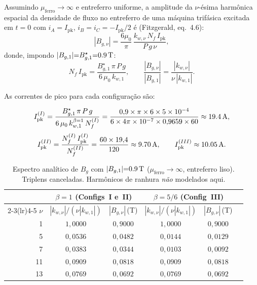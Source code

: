 \documentclass[12pt,a4paper]{article}
\begin{document}
Assumindo $\mu_\text{ferro}\to\infty$ e entreferro uniforme, a amplitude da
$\nu$-ésima harmônica espacial da densidade de fluxo no entreferro de uma
máquina trifásica excitada em $t{=}0$ com $i_A{=}I_\text{pk}$,
$i_B{=}i_C{=}{-}I_\text{pk}/2$ é (Fitzgerald, eq.~4.6):
%
\begin{equation}
|B_{g,\nu}| = \frac{6\mu_0}{\pi}\,
              \frac{k_{w,\nu}\,N_f\,I_\text{pk}}{P\,g\,\nu},
\label{eq:Bgnu}
\end{equation}
%
donde, impondo $|B_{g,1}|{=}B_{g,1}^{\star}{=}\SI{0{,}9}{T}$:
%
\begin{equation}
N_f\,I_\text{pk} = \frac{B_{g,1}^{\star}\,\pi\,P\,g}{6\,\mu_0\,k_{w,1}},
\qquad
\frac{|B_{g,\nu}|}{|B_{g,1}|}=\frac{|k_{w,\nu}|}{\nu\,|k_{w,1}|}.
\label{eq:espectro}
\end{equation}

As correntes de pico para cada configuração são:

\begin{equation}
I_\text{pk}^{(I)}
  = \frac{B_{g,1}^{\star}\,\pi\,P\,g}{6\,\mu_0\,k_{w,1}^{\beta=1}\,N_f^{(I)}}
  = \frac{0{,}9\times\pi\times6\times5\times10^{-4}}
         {6\times4\pi\times10^{-7}\times0{,}9659\times60}
  \approx \SI{19{,}4}{A},
\label{eq:Ipk1}
\end{equation}
\[
I_\text{pk}^{(II)} = \frac{N_f^{(I)}\,I_\text{pk}^{(I)}}{N_f^{(II)}}
  = \frac{60\times19{,}4}{120} \approx \SI{9{,}70}{A},
\qquad
I_\text{pk}^{(III)} \approx \SI{10{,}05}{A}.
\]

\begin{table}[h!]
\vspace{-1pt}\centering\small
\caption{Espectro analítico de $B_g$ com $|B_{g,1}|{=}\SI{0{,}9}{T}$
         ($\mu_\text{ferro}\to\infty$, entreferro liso).
         Triplens canceladas. Harmônicos de ranhura \emph{não} modelados aqui.}
\label{tab:espectro}
\setlength{\tabcolsep}{6pt}
\begin{tabular}{rccccc}
\toprule
      & \multicolumn{2}{c}{$\beta{=}1$ (Configs~I e~II)}
      & \multicolumn{2}{c}{$\beta{=}5/6$ (Config~III)}\\
\cmidrule(lr){2-3}\cmidrule(lr){4-5}
$\nu$ & $|k_{w,\nu}|/(\nu|k_{w,1}|)$ & $|B_{g,\nu}|$\,(T)
      & $|k_{w,\nu}|/(\nu|k_{w,1}|)$ & $|B_{g,\nu}|$\,(T)\\
\midrule
 1 & $1{,}0000$ & $0{,}9000$ & $1{,}0000$ & $0{,}9000$\\
 5 & $0{,}0536$ & $0{,}0482$ & $0{,}0144$ & $0{,}0129$\\
 7 & $0{,}0383$ & $0{,}0344$ & $0{,}0103$ & $0{,}0092$\\
11 & $0{,}0909$ & $0{,}0818$ & $0{,}0909$ & $0{,}0818$\\
13 & $0{,}0769$ & $0{,}0692$ & $0{,}0769$ & $0{,}0692$\\
\bottomrule
\end{tabular}
\end{table}
\end{document}
